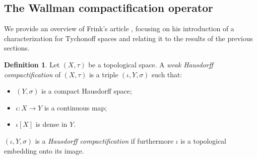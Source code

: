 \documentclass{article}
\theoremstyle{plain}
\theoremstyle{definition}
\newtheorem{definition}[theorem]{Definition}
\theoremstyle{remark}
\newcommand{\0}{\mathbbm 0}
\newcommand{\1}{\mathbbm 1}
\newcommand{\2}{\mathbbm 2}
\begin{document}
\subsection{The Wallman compactification operator}
\label{subsec:wallman-frinkcompactification}

We provide an overview of Frink's article \cite{frink}, focusing on his introduction of a characterization for Tychonoff spaces and relating it to the results of the previous sections. 

\begin{definition}
\label{def:weakhausdorffcompactification}
Let $(X,\tau)$ be a topological space. A \emph{weak Hausdorff compactification} of $(X,\tau)$ is a triple $(\iota,Y,\sigma)$ such that:

\begin{itemize}
\item
$(Y,\sigma)$ is a compact Hausdorff space;

\item
$\iota:X\to Y$ is a continuous map; 

\item $ \iota[X]$ is dense in $Y$.
\end{itemize}
$(\iota,Y,\sigma)$ is a \emph{Hausdorff compactification} if furthermore $\iota$ is a topological embedding onto its image.
\end{definition}
\end{document}
